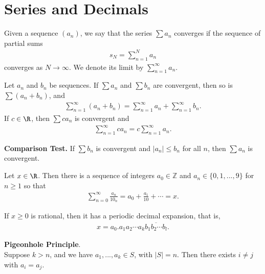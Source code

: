 \documentclass{article}
\begin{document}
\section{Series and Decimals}
\begin{definition}
    Given a sequence $(a_n)$, we say that the series $\sum a_n$ converges if the sequence of partial sums
    \begin{align*}
        s_N=\sum_{n=1}^N a_n
    \end{align*}
    converges as $N\to\infty$. We denote its limit by $\sum_{n=1}^\infty a_n$.
\end{definition}
\begin{theorem}
    Let $a_n$ and $b_n$ be sequences. If $\sum a_n$ and $\sum b_n$ are convergent, then so is $\sum (a_n+b_n)$, and
    \begin{align*}
        \sum_{n=1}^\infty (a_n+b_n) = \sum_{n=1}^\infty a_n+ \sum_{n=1}^\infty b_n.
    \end{align*}
    If $c\in\R$, then $\sum ca_n$ is convergent and
    \begin{align*}
        \sum_{n=1}^\infty ca_n = c\sum_{n=1}^\infty a_n.
    \end{align*}
\end{theorem}
\begin{theorem}
    \textbf{Comparison Test.} If $\sum b_n$ is convergent and $|a_n|\leq b_n$ for all $n$, then $\sum a_n$ is convergent.
\end{theorem}
\begin{theorem}
    Let $x\in\R$. Then there is a sequence of integers $a_0\in\mathbb{Z}$ and $a_n\in\{0,1,...,9\}$ for $n\geq 1$ so that
    \begin{align*}
        \sum_{n=0}^\infty \frac{a_n}{10_n}=a_0+\frac{a_1}{10}+\cdots = x.
    \end{align*}
\end{theorem}
\begin{theorem}
    If $x\geq 0$ is rational, then it has a periodic decimal expansion, that is,
    \begin{align*}
        x=a_0.a_1a_2\cdots a_k\overline{b_1b_2\cdots b_l}.
    \end{align*}
\end{theorem}
\begin{definition}
    \textbf{Pigeonhole Principle}.\\
    Suppose $k>n$, and we have $a_1,...,a_k\in S$, with $|S|=n$. Then there exists $i\not=j$ with $a_i=a_j$.
\end{definition}
\end{document}

